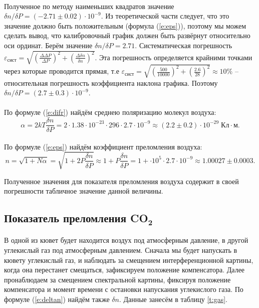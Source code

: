 \documentclass[a4paper,12pt]{article} %
\begin{document}
\paragraph{} Полученное по методу наименьших квадратов значение $\delta n / \delta P = (-2.71 \pm 0.02) \cdot 10^{-9}$. Из теоретической части следует, что это значение должно быть положительным (формула (\ref{e:eps})), поэтому мы можем сделать вывод, что калибровочный график должен быть развёрнут относительно оси ординат. Берём значение $\delta n / \delta P = 2.71$. Систематическая погрешность $\varepsilon_\text{сист} = \sqrt{\left(\frac{\Delta \Delta P}{\Delta P} \right)^2 + \left(\frac{\Delta \delta n}{\delta n} \right)^2}$. Эта погрешность определяется крайними точками через которые проводится прямая, т.е $\varepsilon_\text{сист} = \sqrt{\left(\frac{500}{10000} \right)^2 + \left(\frac{2.6}{28} \right)^2} \approx 10 \%$ -- относительная погрешность коэффициента наклона графика. Поэтому $\delta n / \delta P = (2.7 \pm 0.3) \cdot 10^{-9}$.

\paragraph{} По формуле (\ref{e:difr}) найдём среднею поляризацию молекул воздуха:
\[
\alpha = 2kT \frac{\delta n}{\delta P} = 2 \cdot 1.38 \cdot 10^{-23} \cdot 296 \cdot 2.7 \cdot 10^{-9} \approx (2.2 \pm 0.2) \cdot 10^{-29} \; \text{Кл}\cdot\text{м}.
\]
\paragraph{} По формуле (\ref{e:eps}) найдём коэффициент преломления воздуха:
\[
n = \sqrt{1 + N \alpha} = \sqrt{1 + 2 P \frac{\delta n}{\delta P}} \approx 1 + P \frac{\delta n}{\delta P} = 1 + \cdot 10^5 \cdot 2.7 \cdot 10^{-9} \approx 1.00027 \pm 0.0003.
\]

\noindent Полученное значения для показателя преломления воздуха содержит в своей погрешности табличное значение данной величины.

\subsection{Показатель преломления CO$_\mathbf{2}$}

\paragraph{} В одной из кювет будет находится воздух под атмосферным давление, в другой углекислый газ под атмосферным давлением. Сначала мы будет напускать в кювету углекислый газ, и наблюдать за смещением интерференционной картины, когда она перестанет смещаться, зафиксируем положение компенсатора. Далее пронаблюдаем за смещением спектральной картины, фиксируя положение компенсатора и момент времени с остановки напускания углекислого газа. По формуле (\ref{e:deltan}) найдём также $\delta n$. Данные занесём в таблицу \ref{t:gas}.
\end{document}
